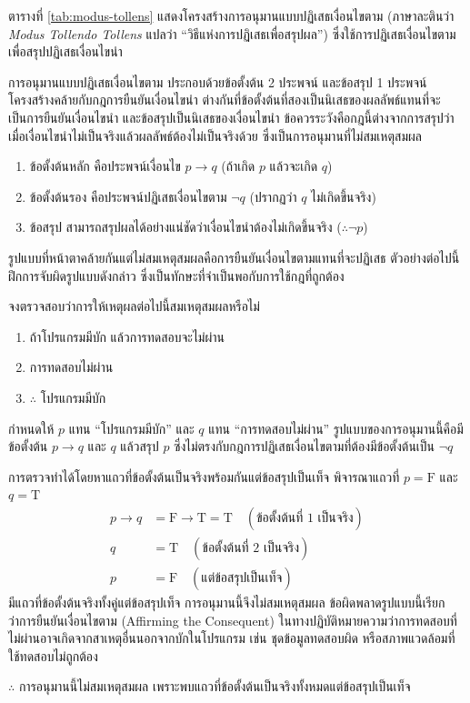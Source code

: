 ตารางที่ \ref{tab:modus-tollens} แสดงโครงสร้างการอนุมานแบบปฏิเสธเงื่อนไขตาม (ภาษาละตินว่า \textit{Modus Tollendo Tollens} แปลว่า ``วิธีแห่งการปฏิเสธเพื่อสรุปผล'') ซึ่งใช้การปฏิเสธเงื่อนไขตามเพื่อสรุปปฏิเสธเงื่อนไขนำ

การอนุมานแบบปฏิเสธเงื่อนไขตาม ประกอบด้วยข้อตั้งต้น 2 ประพจน์ และข้อสรุป 1 ประพจน์ โครงสร้างคล้ายกับกฎการยืนยันเงื่อนไขนำ ต่างกันที่ข้อตั้งต้นที่สองเป็นนิเสธของผลลัพธ์แทนที่จะเป็นการยืนยันเงื่อนไขนำ และข้อสรุปเป็นนิเสธของเงื่อนไขนำ ข้อควรระวังคือกฎนี้ต่างจากการสรุปว่าเมื่อเงื่อนไขนำไม่เป็นจริงแล้วผลลัพธ์ต้องไม่เป็นจริงด้วย ซึ่งเป็นการอนุมานที่ไม่สมเหตุสมผล~\parencite{mendelson2015introduction}
\begin{enumerate}
    \item ข้อตั้งต้นหลัก คือประพจน์เงื่อนไข $p \rightarrow q$ (ถ้าเกิด $p$ แล้วจะเกิด $q$)
    \item ข้อตั้งต้นรอง คือประพจน์ปฏิเสธเงื่อนไขตาม $\neg q$ (ปรากฏว่า $q$ ไม่เกิดขึ้นจริง)
    \item ข้อสรุป สามารถสรุปผลได้อย่างแน่ชัดว่าเงื่อนไขนำต้องไม่เกิดขึ้นจริง ($\therefore \neg p$)
\end{enumerate}

รูปแบบที่หน้าตาคล้ายกันแต่ไม่สมเหตุสมผลคือการยืนยันเงื่อนไขตามแทนที่จะปฏิเสธ ตัวอย่างต่อไปนี้ฝึกการจับผิดรูปแบบดังกล่าว ซึ่งเป็นทักษะที่จำเป็นพอกับการใช้กฎที่ถูกต้อง

\begin{ex}
\label{ex:affirming-consequent}
จงตรวจสอบว่าการให้เหตุผลต่อไปนี้สมเหตุสมผลหรือไม่
\begin{enumerate}
    \item ถ้าโปรแกรมมีบัก แล้วการทดสอบจะไม่ผ่าน
    \item การทดสอบไม่ผ่าน
    \item $\therefore$ โปรแกรมมีบัก
\end{enumerate}
\end{ex}

\begin{solution}
กำหนดให้ $p$ แทน ``โปรแกรมมีบัก'' และ $q$ แทน ``การทดสอบไม่ผ่าน'' รูปแบบของการอนุมานนี้คือมีข้อตั้งต้น $p \rightarrow q$ และ $q$ แล้วสรุป $p$ ซึ่งไม่ตรงกับกฎการปฏิเสธเงื่อนไขตามที่ต้องมีข้อตั้งต้นเป็น $\neg q$

การตรวจทำได้โดยหาแถวที่ข้อตั้งต้นเป็นจริงพร้อมกันแต่ข้อสรุปเป็นเท็จ พิจารณาแถวที่ $p = \text{F}$ และ $q = \text{T}$
\begin{align*}
p \rightarrow q &= \text{F} \rightarrow \text{T} = \text{T} \quad (\text{ข้อตั้งต้นที่ 1 เป็นจริง})\\
q &= \text{T} \quad (\text{ข้อตั้งต้นที่ 2 เป็นจริง})\\
p &= \text{F} \quad (\text{แต่ข้อสรุปเป็นเท็จ})
\end{align*}
มีแถวที่ข้อตั้งต้นจริงทั้งคู่แต่ข้อสรุปเท็จ การอนุมานนี้จึงไม่สมเหตุสมผล ข้อผิดพลาดรูปแบบนี้เรียกว่าการยืนยันเงื่อนไขตาม (Affirming the Consequent) ในทางปฏิบัติหมายความว่าการทดสอบที่ไม่ผ่านอาจเกิดจากสาเหตุอื่นนอกจากบักในโปรแกรม เช่น ชุดข้อมูลทดสอบผิด หรือสภาพแวดล้อมที่ใช้ทดสอบไม่ถูกต้อง

$\therefore$ การอนุมานนี้ไม่สมเหตุสมผล เพราะพบแถวที่ข้อตั้งต้นเป็นจริงทั้งหมดแต่ข้อสรุปเป็นเท็จ \solhere
\end{solution}

